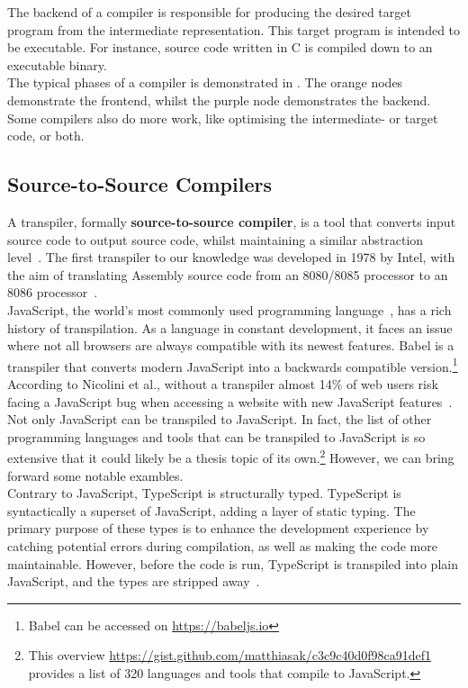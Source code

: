 The backend of a compiler is responsible for producing the desired target program from the intermediate representation. This target program is intended to be executable. For instance, source code written in C is compiled down to an executable binary. \\

The typical phases of a compiler is demonstrated in . The orange nodes demonstrate the frontend, whilst the purple node demonstrates the backend. Some compilers also do more work, like optimising the intermediate- or target code, or both.

\subsection{Source-to-Source Compilers}

A transpiler, formally \textbf{source-to-source compiler}, is a tool that converts input source code to output source code, whilst maintaining a similar abstraction level~\cite{whatIsATranspiler}. The first transpiler to our knowledge was developed in 1978 by Intel, with the aim of translating Assembly source code from an 8080/8085 processor to an 8086 processor~\cite{theFirstTranspiler}. \\

JavaScript, the world's most commonly used programming language~\cite{javaScriptIsCommon}, has a rich history of transpilation. As a language in constant development, it faces an issue where not all browsers are always compatible with its newest features. Babel is a transpiler that converts modern JavaScript into a backwards compatible version.\footnote{Babel can be accessed on \url{https://babeljs.io}} According to Nicolini et al., without a transpiler almost 14\% of web users risk facing a JavaScript bug when accessing a website with new JavaScript features~\cite{DBLP:journals/software/NicoliniHF24}. \\

Not only JavaScript can be transpiled to JavaScript. In fact, the list of other programming languages and tools that can be transpiled to JavaScript is so extensive that it could likely be a thesis topic of its own.\footnote{This overview \url{https://gist.github.com/matthiasak/c3c9c40d0f98ca91def1} provides a list of 320 languages and tools that compile to JavaScript.} However, we can bring forward some notable exambles. \\

Contrary to JavaScript, TypeScript is structurally typed. TypeScript is syntactically a superset of JavaScript, adding a layer of static typing. The primary purpose of these types is to enhance the development experience by catching potential errors during compilation, as well as making the code more maintainable. However, before the code is run, TypeScript is transpiled into plain JavaScript, and the types are stripped away~\cite{TypeScript}. \\

